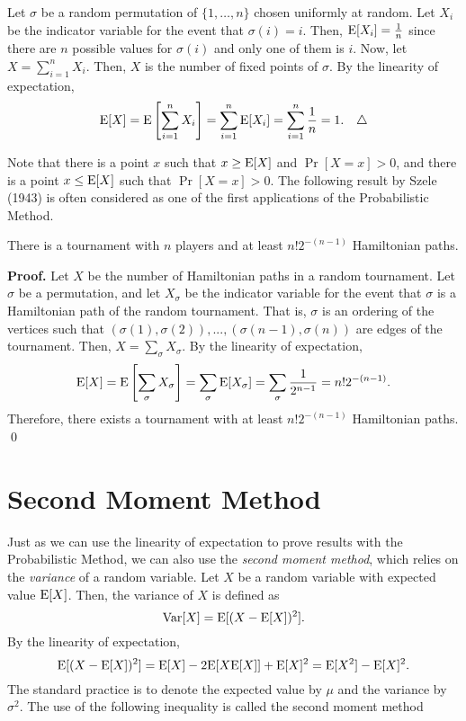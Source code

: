 \begin{example}\label{ex:probmet:linearity}
    Let $\sigma$ be a random permutation of $\{1, \ldots, n\}$ chosen uniformly at random. Let $X_i$ be the indicator variable for the event that $\sigma(i) = i$. Then, $\mathrm{E}[X_i] = \frac{1}{n}$ since there are $n$ possible values for $\sigma(i)$ and only one of them is $i$. Now, let $X = \sum_{i = 1}^n X_i$. Then, $X$ is the number of fixed points of $\sigma$. By the linearity of expectation,
    \[\EE[X] = \EE\left[\sum_{i = 1}^n X_i\right] = \sum_{i = 1}^n \EE[X_i] = \sum_{i = 1}^n \frac{1}{n} = 1.\tqed\]
\end{example}
Note that there is a point $x$ such that $x \geq \mathrm{E}[X]$ and $\Pr[X = x] > 0$, and there is a point $x \leq \mathrm{E}[X]$ such that $\Pr[X = x] > 0$. The following result by Szele (1943) is often considered as one of the first applications of the Probabilistic Method. \par
\begin{theorem}
    There is a tournament with $n$ players and at least $n!2^{-(n - 1)}$ Hamiltonian paths. 
\end{theorem}
\textbf{Proof. } Let $X$ be the number of Hamiltonian paths in a random tournament. Let $\sigma$ be a permutation, and let $X_\sigma$ be the indicator variable for the event that $\sigma$ is a Hamiltonian path of the random tournament. That is, $\sigma$ is an ordering of the vertices such that $(\sigma(1), \sigma(2)), ..., (\sigma(n - 1), \sigma(n))$ are edges of the tournament. Then, $X = \sum_{\sigma} X_\sigma$. By the linearity of expectation,
\[\mathrm{E}[X] = \mathrm{E}\left[\sum_{\sigma} X_\sigma\right] = \sum_{\sigma} \mathrm{E}[X_\sigma] = \sum_{\sigma} \frac{1}{2^{n - 1}} = n!2^{-(n - 1)}.\]
Therefore, there exists a tournament with at least $n!2^{-(n - 1)}$ Hamiltonian paths. \qed

\section{Second Moment Method}\label{sec:probmet:secondmoment}

Just as we can use the linearity of expectation to prove results with the Probabilistic Method, we can also use the \textit{second moment method}, which relies on the \textit{variance} of a random variable. Let $X$ be a random variable with expected value $\mathrm{E}[X]$. Then, the variance of $X$ is defined as
\[\mathrm{Var}[X] = \mathrm{E}[(X - \mathrm{E}[X])^2].\]
By the linearity of expectation, 
\[\mathrm{E}[(X - \mathrm{E}[X])^2] = \mathrm{E}[X] - 2\mathrm{E}[X\mathrm{E}[X]] + \mathrm{E}[X]^2 = \mathrm{E}[X^2] - \mathrm{E}[X]^2.\]
The standard practice is to denote the expected value by $\mu$ and the variance by $\sigma^2$. The use of the following inequality is called the second moment method \par

